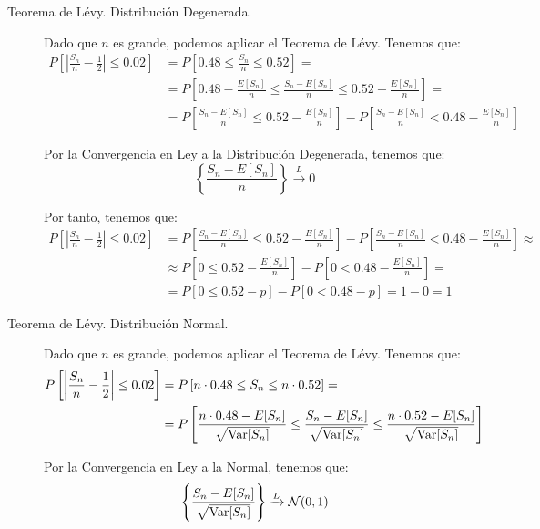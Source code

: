 \begin{ejercicio}
\begin{description}
        \item [Teorema de Lévy. Distribución Degenerada.] Dado que $n$ es grande, podemos aplicar el Teorema de Lévy. Tenemos que:
        \begin{align*}
            P\left[\left|\frac{S_{n}}{n} - \frac{1}{2}\right| \leq 0.02\right] &= 
            P\left[0.48 \leq \frac{S_{n}}{n} \leq 0.52\right]
            =\\&= P\left[0.48 - \frac{E[S_{n}]}{n} \leq \frac{S_{n}-E[S_n]}{n} \leq 0.52 - \frac{E[S_{n}]}{n}\right]
            = \\&= P\left[\frac{S_{n}-E[S_n]}{n} \leq 0.52 - \frac{E[S_{n}]}{n}\right] - P\left[\frac{S_{n}-E[S_n]}{n} < 0.48 - \frac{E[S_{n}]}{n}\right]
        \end{align*}

        Por la Convergencia en Ley a la Distribución Degenerada, tenemos que:
        \begin{equation*}
            \left\{\frac{S_{n}-E[S_n]}{n}\right\}\xrightarrow{L} 0
        \end{equation*}
        
        Por tanto, tenemos que:
        \begin{align*}
            P\left[\left|\frac{S_{n}}{n} - \frac{1}{2}\right| \leq 0.02\right] &= 
            P\left[\frac{S_{n}-E[S_n]}{n} \leq 0.52 - \frac{E[S_{n}]}{n}\right] - P\left[\frac{S_{n}-E[S_n]}{n} < 0.48 - \frac{E[S_{n}]}{n}\right]
            \approx \\&\approx P\left[0 \leq 0.52 - \frac{E[S_{n}]}{n}\right] - P\left[0 < 0.48 - \frac{E[S_{n}]}{n}\right]
            = \\&= P\left[0 \leq 0.52 - p\right] - P\left[0 < 0.48 - p\right]
            = 1 - 0 = 1
        \end{align*}

        \item [Teorema de Lévy. Distribución Normal.] Dado que $n$ es grande, podemos aplicar el Teorema de Lévy. Tenemos que:
        \begin{align*}
            P\left[\left|\frac{S_{n}}{n} - \frac{1}{2}\right| \leq 0.02\right] &= 
            P\left[n\cdot 0.48 \leq S_{n} \leq n\cdot 0.52\right]
            =\\&= P\left[\frac{n\cdot 0.48 - E[S_{n}]}{\sqrt{\operatorname{Var}[S_{n}]}} \leq \frac{S_{n}-E[S_n]}{\sqrt{\operatorname{Var}[S_{n}]}} \leq \frac{n\cdot 0.52 - E[S_{n}]}{\sqrt{\operatorname{Var}[S_{n}]}}\right]
        \end{align*}

        Por la Convergencia en Ley a la Normal, tenemos que:
        \begin{equation*}
            \left\{\frac{S_{n}-E[S_n]}{\sqrt{\operatorname{Var}[S_{n}]}}\right\}\xrightarrow{L} \mathcal{N}(0,1)
        \end{equation*}


\end{description}
\end{ejercicio}
